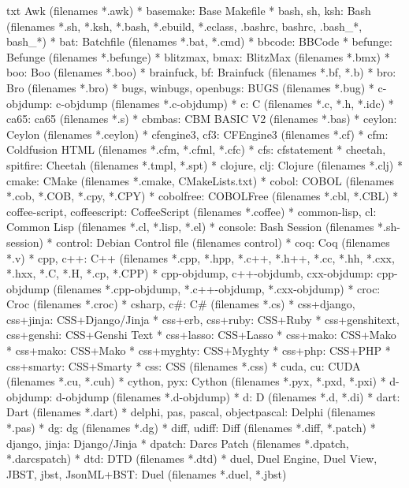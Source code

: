 \documentclass[11pt,oneside]{book}
\begin{document}
\begin{common-format}
\begin{xverbatim}{txt}
    Awk (filenames *.awk)
* basemake:
    Base Makefile 
* bash, sh, ksh:
    Bash (filenames *.sh, *.ksh, *.bash, *.ebuild,
     *.eclass, .bashrc, bashrc, .bash_*, bash_*)
* bat:
    Batchfile (filenames *.bat, *.cmd)
* bbcode:
    BBCode 
* befunge:
    Befunge (filenames *.befunge)
* blitzmax, bmax:
    BlitzMax (filenames *.bmx)
* boo:
    Boo (filenames *.boo)
* brainfuck, bf:
    Brainfuck (filenames *.bf, *.b)
* bro:
    Bro (filenames *.bro)
* bugs, winbugs, openbugs:
    BUGS (filenames *.bug)
* c-objdump:
    c-objdump (filenames *.c-objdump)
* c:
    C (filenames *.c, *.h, *.idc)
* ca65:
    ca65 (filenames *.s)
* cbmbas:
    CBM BASIC V2 (filenames *.bas)
* ceylon:
    Ceylon (filenames *.ceylon)
* cfengine3, cf3:
    CFEngine3 (filenames *.cf)
* cfm:
    Coldfusion HTML (filenames *.cfm, *.cfml, *.cfc)
* cfs:
    cfstatement 
* cheetah, spitfire:
    Cheetah (filenames *.tmpl, *.spt)
* clojure, clj:
    Clojure (filenames *.clj)
* cmake:
    CMake (filenames *.cmake, CMakeLists.txt)
* cobol:
    COBOL (filenames *.cob, *.COB, *.cpy, *.CPY)
* cobolfree:
    COBOLFree (filenames *.cbl, *.CBL)
* coffee-script, coffeescript:
    CoffeeScript (filenames *.coffee)
* common-lisp, cl:
    Common Lisp (filenames *.cl, *.lisp, *.el)
* console:
    Bash Session (filenames *.sh-session)
* control:
    Debian Control file (filenames control)
* coq:
    Coq (filenames *.v)
* cpp, c++:
    C++ (filenames *.cpp, *.hpp, *.c++, *.h++, *.cc, *.hh, *.cxx, *.hxx, *.C, *.H, *.cp, *.CPP)
* cpp-objdump, c++-objdumb, cxx-objdump:
    cpp-objdump (filenames *.cpp-objdump, *.c++-objdump, *.cxx-objdump)
* croc:
    Croc (filenames *.croc)
* csharp, c#:
    C# (filenames *.cs)
* css+django, css+jinja:
    CSS+Django/Jinja 
* css+erb, css+ruby:
    CSS+Ruby 
* css+genshitext, css+genshi:
    CSS+Genshi Text 
* css+lasso:
    CSS+Lasso 
* css+mako:
    CSS+Mako 
* css+mako:
    CSS+Mako 
* css+myghty:
    CSS+Myghty 
* css+php:
    CSS+PHP 
* css+smarty:
    CSS+Smarty 
* css:
    CSS (filenames *.css)
* cuda, cu:
    CUDA (filenames *.cu, *.cuh)
* cython, pyx:
    Cython (filenames *.pyx, *.pxd, *.pxi)
* d-objdump:
    d-objdump (filenames *.d-objdump)
* d:
    D (filenames *.d, *.di)
* dart:
    Dart (filenames *.dart)
* delphi, pas, pascal, objectpascal:
    Delphi (filenames *.pas)
* dg:
    dg (filenames *.dg)
* diff, udiff:
    Diff (filenames *.diff, *.patch)
* django, jinja:
    Django/Jinja 
* dpatch:
    Darcs Patch (filenames *.dpatch, *.darcspatch)
* dtd:
    DTD (filenames *.dtd)
* duel, Duel Engine, Duel View, JBST, jbst, JsonML+BST:
    Duel (filenames *.duel, *.jbst)

\end{xverbatim}
\end{common-format}
\end{document}
